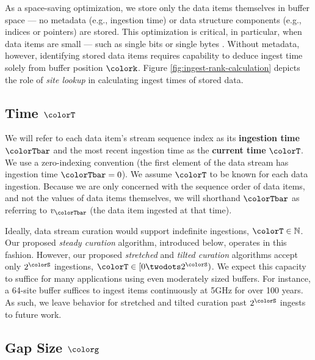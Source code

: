 As a space-saving optimization, we store only the data items themselves in buffer space --- no metadata (e.g., ingestion time) or data structure components (e.g., indices or pointers) are stored.
This optimization is critical, in particular, when data items are small --- such as single bits or single bytes \citep{moreno2022hereditary}.
Without metadata, however, identifying stored data items requires capability to deduce ingest time solely from buffer position $\colork$.
Figure \ref{fig:ingest-rank-calculation} depicts the role of \textit{site lookup} in calculating ingest times of stored data.

\subsection{Time $\colorT$}
\label{sec:notation-time}

We will refer to each data item's stream sequence index as its \textbf{ingestion time} $\colorTbar$ and the most recent ingestion time as the \textbf{current time} $\colorT$.
We use a zero-indexing convention (the first element of the data stream has ingestion time $\colorTbar=0$).
We assume $\colorT$ to be known for each data ingestion.
Because we are only concerned with the sequence order of data items, and not the values of data items themselves, we will shorthand $\colorTbar$ as referring to $v_{\colorTbar}$ (the data item ingested at that time).

Ideally, data stream curation would support indefinite ingestions, $\colorT \in \mathbb{N}$.
Our proposed \textit{steady curation} algorithm, introduced below, operates in this fashion.
However, our proposed \textit{stretched} and \textit{tilted curation} algorithms accept only $2^{\colorS}$ ingestions, $\colorT \in [0 \twodots 2^{\colorS})$.
We expect this capacity to suffice for many applications using even moderately sized buffers.
For instance, a 64-site buffer suffices to ingest items continuously at 5GHz for over 100 years.
As such, we leave behavior for stretched and tilted curation past $2^{\colorS}$ ingests to future work.

\subsection{Gap Size $\colorg$}
\label{sec:notation-gapsize}

